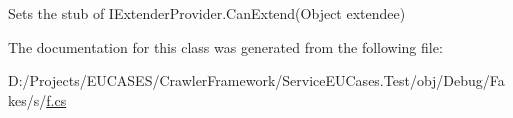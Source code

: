Sets the stub of I\-Extender\-Provider.\-Can\-Extend(\-Object extendee)



The documentation for this class was generated from the following file\-:\begin{DoxyCompactItemize}
\item 
D\-:/\-Projects/\-E\-U\-C\-A\-S\-E\-S/\-Crawler\-Framework/\-Service\-E\-U\-Cases.\-Test/obj/\-Debug/\-Fakes/s/\hyperlink{s_2f_8cs}{f.\-cs}\end{DoxyCompactItemize}
